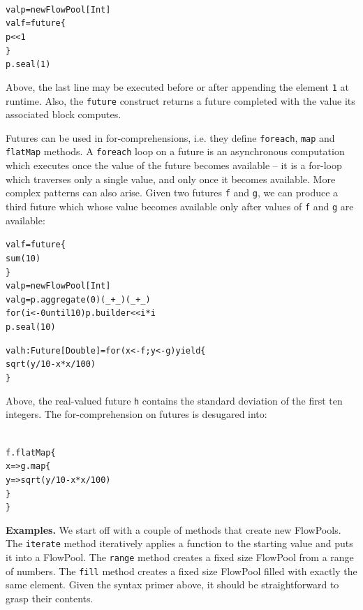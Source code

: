 \documentclass[runningheads,a4paper]{llncs}
\begin{document}
\begin{minipage}[b]{3.75 cm}
\begin{alltt}
{\scriptsize
val p = new FlowPool[Int]
val f = future \{
  p << 1
\}
p.seal(1)
}
\end{alltt}
\end{minipage}

Above, the last line may be executed before or after appending the element
\verb=1= at runtime.
Also, the \verb=future= construct returns a future completed with the value
its associated block computes.

Futures can be used in for-comprehensions, i.e. they define \verb=foreach=,
\verb=map= and \verb=flatMap= methods.
A \verb=foreach= loop on a future is an asynchronous computation which executes
once the value of the future becomes available -- it is a for-loop which traverses
only a single value, and only once it becomes available.
More complex patterns can also arise.
Given two futures \verb=f= and \verb=g=, we can produce a third future which
whose value becomes available only after values of \verb=f= and \verb=g=
are available:

\begin{minipage}[b]{3.75 cm}
\begin{alltt}
{\scriptsize
val f = future \{
  sum(10)
\}
val p = new FlowPool[Int]
val g = p.aggregate(0)(_ + _)(_ + _)
for (i <- 0 until 10) p.builder << i * i
p.seal(10)

val h: Future[Double] = for (x <- f; y <- g) yield \{
  sqrt(y / 10 - x * x / 100)
\}
}
\end{alltt}
\end{minipage}

Above, the real-valued future \verb=h= contains the standard
deviation of the first ten integers.
The for-comprehension on futures is desugared into:

\begin{minipage}[b]{3.75 cm}
\begin{alltt}
{\scriptsize
f.flatMap \{
  x => g.map \{
    y => sqrt(y / 10 - x * x / 100)
  \}
\}
}
\end{alltt}
\end{minipage}


\textbf{Examples.}
We start off with a couple of methods that create new FlowPools.
The \verb=iterate= method iteratively applies a function to the starting
value and puts it into a FlowPool.
The \verb=range= method creates a fixed size FlowPool from a range of numbers.
The \verb=fill= method creates a fixed size FlowPool filled with exactly
the same element.
Given the syntax primer above, it should be straightforward to grasp
their contents.
\end{document}
